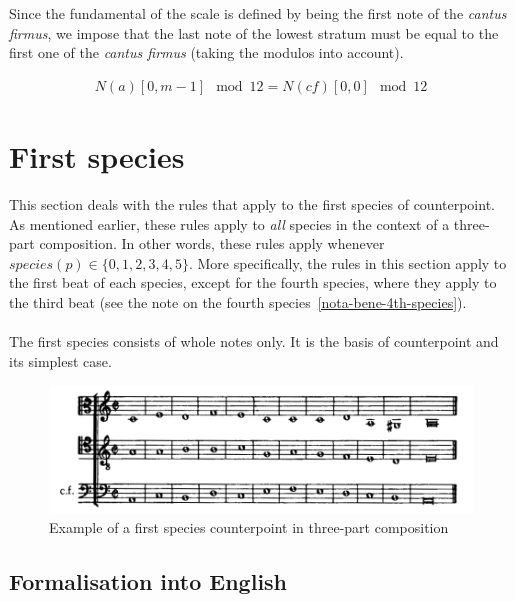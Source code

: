     Since the fundamental of the scale is defined by being the first note of the \textit{cantus firmus}, we impose that the last note of the lowest stratum must be equal to the first one of the \textit{cantus firmus} (taking the modulos into account).
    
    
    \begin{equation} \begin{aligned}
    N(a)[0, m-1] \mod 12 = N(\mathit{cf})[0, 0] \mod 12
    \end{aligned} \end{equation}

\section{First species}
This section deals with the rules that apply to the first species of counterpoint. As mentioned earlier, these rules apply to \textit{all} species in the context of a three-part composition. In other words, these rules apply whenever $species(p) \in \{0, 1, 2, 3, 4, 5\}$. More specifically, the rules in this section apply to the first beat of each species, except for the fourth species, where they apply to the third beat (see the note on the fourth species~\ref{nota-bene-4th-species}).

\paragraph{}
The first species consists of whole notes only. It is the basis of counterpoint and its simplest case. 

\begin{figure}[h]
    \centering
    \includegraphics[width=1\textwidth]{Images/Species_examples/1sp-example.png}
    \caption{Example of a first species counterpoint in three-part composition}
    \label{fig:example-1sp}
\end{figure}

\subsection{Formalisation into English}
